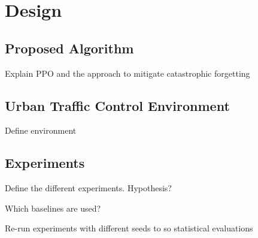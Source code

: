 \chapter{Design}


\section{Proposed Algorithm}

Explain PPO and the approach to mitigate catastrophic forgetting

\section{Urban Traffic Control Environment}

Define environment

\section{Experiments}

Define the different experiments. Hypothesis?

Which baselines are used?

Re-run experiments with different seeds to so statistical evaluations